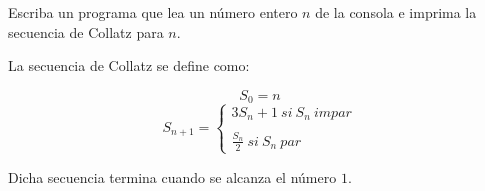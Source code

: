 Escriba un programa que lea un número entero \( n \) de la consola e imprima la secuencia de Collatz para \( n \).

La secuencia de Collatz se define como:

\[ S_0 = n \]
\[ S_{n+1} = \left\{ \begin{array}{lcc}
             3 S_n + 1 ~ si ~ S_n ~ impar \\
             \\ \frac{S_n}{2} ~ si ~ S_n ~ par
             \end{array}
   \right. \]

Dicha secuencia termina cuando se alcanza el número \( 1 \).
